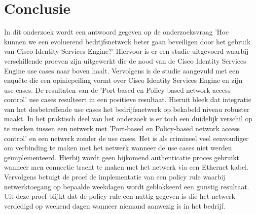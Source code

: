 
\chapter{Conclusie}
\label{ch:conclusie}

In dit onderzoek wordt een antwoord gegeven op de onderzoeksvraag 'Hoe kunnen we een evoluerend bedrijfsnetwerk beter gaan beveiligen door het gebruik van Cisco Identity Services Engine?' Hiervoor is er een studie uitgevoerd waarbij verschillende proeven zijn uitgewerkt die de nood van de Cisco Identity Services Engine use cases naar boven haalt. Vervolgens is de studie aangevuld met een enquête die een opiniepeiling vormt over Cisco Identity Services Engine en zijn use cases.
\newline
\newline
De resultaten van de 'Port-based en Policy-based network access control' use cases resulteert in een positieve resultaat. Hieruit bleek dat integratie van het desbetreffende use cases het bedrijfsnetwerk op bekabeld niveau robuster maakt. In het praktisch deel van het onderzoek is er toch een duidelijk verschil op te merken tussen een netwerk met 'Port-based en Policy-based network access control' en een netwerk zonder de use cases. Het is als crimineel veel eenvoudiger om verbinding te maken met het netwerk wanneer de use cases niet werden geïmplementeerd. Hierbij wordt geen bijkomend authenticatie proces gebruikt wanneer men connectie tracht te maken met het netwerk via een Ethernet kabel. Vervolgens betuigt de proef de implementatie van een policy rule waarbij netwerktoegang op bepaalde weekdagen wordt geblokkeerd een gunstig resultaat. Uit deze proef blijkt dat de policy rule een nuttig gegeven is die het netwerk verdedigd op weekend dagen wanneer niemand aanwezig is in het bedrijf.

